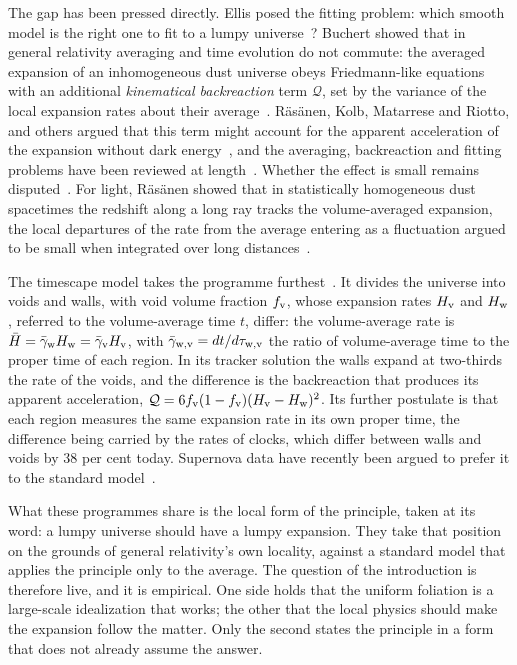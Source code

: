 \documentclass[twocolumn]{aastex701}
\begin{document}
The gap has been pressed directly. Ellis posed the fitting problem: which smooth model is the right one to fit to a lumpy universe~\citep{Ellis1984}? Buchert showed that in general relativity averaging and time evolution do not commute: the averaged expansion of an inhomogeneous dust universe obeys Friedmann-like equations with an additional \emph{kinematical backreaction} term $\mathcal{Q}$, set by the variance of the local expansion rates about their average~\citep{Buchert2000, Buchert2008}. R\"as\"anen, Kolb, Matarrese and Riotto, and others argued that this term might account for the apparent acceleration of the expansion without dark energy~\citep{Rasanen2004, Kolb2006}, and the averaging, backreaction and fitting problems have been reviewed at length~\citep{Clarkson2011, BuchertRasanen2012}. Whether the effect is small remains disputed~\citep{GreenWald2011, GreenWald2014, Buchert2015}. For light, R\"as\"anen showed that in statistically homogeneous dust spacetimes the redshift along a long ray tracks the volume-averaged expansion, the local departures of the rate from the average entering as a fluctuation argued to be small when integrated over long distances~\citep{Rasanen2009}.

The timescape model takes the programme furthest~\citep{Wiltshire2007, Wiltshire2007PRL, Wiltshire2009}. It divides the universe into voids and walls, with void volume fraction $f_{\rm v}$, whose expansion rates $H_{\rm v}$ and $H_{\rm w}$, referred to the volume-average time $t$, differ: the volume-average rate is $\bar H=\bar\gamma_{\rm w}H_{\rm w}=\bar\gamma_{\rm v}H_{\rm v}$, with $\bar\gamma_{\rm w,v}=dt/d\tau_{\rm w,v}$ the ratio of volume-average time to the proper time of each region. In its tracker solution the walls expand at two-thirds the rate of the voids, and the difference is the backreaction that produces its apparent acceleration, $\mathcal{Q}=6f_{\rm v}(1-f_{\rm v})(H_{\rm v}-H_{\rm w})^{2}$. Its further postulate is that each region measures the same expansion rate in its own proper time, the difference being carried by the rates of clocks, which differ between walls and voids by 38 per cent today. Supernova data have recently been argued to prefer it to the standard model~\citep{Seifert2025}.

What these programmes share is the local form of the principle, taken at its word: a lumpy universe should have a lumpy expansion. They take that position on the grounds of general relativity's own locality, against a standard model that applies the principle only to the average. The question of the introduction is therefore live, and it is empirical. One side holds that the uniform foliation is a large-scale idealization that works; the other that the local physics should make the expansion follow the matter. Only the second states the principle in a form that does not already assume the answer.
\end{document}
